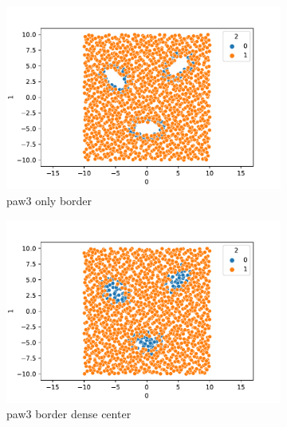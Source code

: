 \documentclass[twoside,leqno,twocolumn]{article}
\begin{document}
\begin{figure}{}
\begin{subfigure}[b]{0.24\textwidth}
        \includegraphics[width=\textwidth]{plots/synthetic_dataset_visualizations/paw3-2d-only-border.csv.pdf}
        \caption[]%
        {{\small paw3 only border}}    
        \label{fig:paw3ob}
    \end{subfigure}
    \begin{subfigure}[b]{0.24\textwidth}   
        \centering 
        \includegraphics[width=\textwidth]{plots/synthetic_dataset_visualizations/paw3-2d-border-dense-center.csv.pdf}
        \caption[]%
        {{\small paw3 border dense center}}    
        \label{fig:paw3bdc}
    \end{subfigure}
    \begin{subfigure}[b]{0.24\textwidth}
        \centering

\end{subfigure}
\end{figure}
\end{document}
